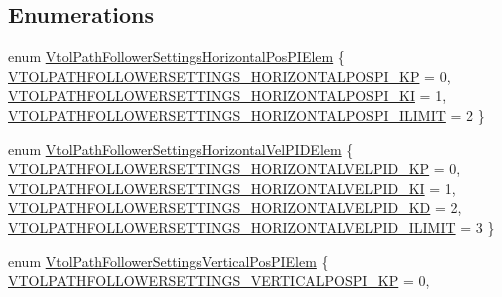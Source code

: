 \subsection*{\-Enumerations}
\begin{DoxyCompactItemize}
\item 
enum \hyperlink{group___vtol_path_follower_settings_ga0f97e6fc6fd7b85c283aca9974a9ee0e}{\-Vtol\-Path\-Follower\-Settings\-Horizontal\-Pos\-P\-I\-Elem} \{ \hyperlink{group___vtol_path_follower_settings_gga0f97e6fc6fd7b85c283aca9974a9ee0ea81b65fc60e82680e2bbb47d49c7cefb8}{\-V\-T\-O\-L\-P\-A\-T\-H\-F\-O\-L\-L\-O\-W\-E\-R\-S\-E\-T\-T\-I\-N\-G\-S\-\_\-\-H\-O\-R\-I\-Z\-O\-N\-T\-A\-L\-P\-O\-S\-P\-I\-\_\-\-K\-P} = 0, 
\hyperlink{group___vtol_path_follower_settings_gga0f97e6fc6fd7b85c283aca9974a9ee0ea598a42eb1fd3c62e285b0cb7c013001f}{\-V\-T\-O\-L\-P\-A\-T\-H\-F\-O\-L\-L\-O\-W\-E\-R\-S\-E\-T\-T\-I\-N\-G\-S\-\_\-\-H\-O\-R\-I\-Z\-O\-N\-T\-A\-L\-P\-O\-S\-P\-I\-\_\-\-K\-I} = 1, 
\hyperlink{group___vtol_path_follower_settings_gga0f97e6fc6fd7b85c283aca9974a9ee0ea1b514b01f7f7cc67559fbcfde8dc5d8d}{\-V\-T\-O\-L\-P\-A\-T\-H\-F\-O\-L\-L\-O\-W\-E\-R\-S\-E\-T\-T\-I\-N\-G\-S\-\_\-\-H\-O\-R\-I\-Z\-O\-N\-T\-A\-L\-P\-O\-S\-P\-I\-\_\-\-I\-L\-I\-M\-I\-T} = 2
 \}
\item 
enum \hyperlink{group___vtol_path_follower_settings_ga6e23e9e9dbc1f73988c39bb155dfd2f7}{\-Vtol\-Path\-Follower\-Settings\-Horizontal\-Vel\-P\-I\-D\-Elem} \{ \hyperlink{group___vtol_path_follower_settings_gga6e23e9e9dbc1f73988c39bb155dfd2f7a296a9a79b82547f81d922ed9fe04f7ec}{\-V\-T\-O\-L\-P\-A\-T\-H\-F\-O\-L\-L\-O\-W\-E\-R\-S\-E\-T\-T\-I\-N\-G\-S\-\_\-\-H\-O\-R\-I\-Z\-O\-N\-T\-A\-L\-V\-E\-L\-P\-I\-D\-\_\-\-K\-P} = 0, 
\hyperlink{group___vtol_path_follower_settings_gga6e23e9e9dbc1f73988c39bb155dfd2f7af536f7bde87052128e9736f3ce52e2d1}{\-V\-T\-O\-L\-P\-A\-T\-H\-F\-O\-L\-L\-O\-W\-E\-R\-S\-E\-T\-T\-I\-N\-G\-S\-\_\-\-H\-O\-R\-I\-Z\-O\-N\-T\-A\-L\-V\-E\-L\-P\-I\-D\-\_\-\-K\-I} = 1, 
\hyperlink{group___vtol_path_follower_settings_gga6e23e9e9dbc1f73988c39bb155dfd2f7a2d699c1acaa523f12d11014596127d4b}{\-V\-T\-O\-L\-P\-A\-T\-H\-F\-O\-L\-L\-O\-W\-E\-R\-S\-E\-T\-T\-I\-N\-G\-S\-\_\-\-H\-O\-R\-I\-Z\-O\-N\-T\-A\-L\-V\-E\-L\-P\-I\-D\-\_\-\-K\-D} = 2, 
\hyperlink{group___vtol_path_follower_settings_gga6e23e9e9dbc1f73988c39bb155dfd2f7ab2ca84213f8a64f867925e105dc9ba0e}{\-V\-T\-O\-L\-P\-A\-T\-H\-F\-O\-L\-L\-O\-W\-E\-R\-S\-E\-T\-T\-I\-N\-G\-S\-\_\-\-H\-O\-R\-I\-Z\-O\-N\-T\-A\-L\-V\-E\-L\-P\-I\-D\-\_\-\-I\-L\-I\-M\-I\-T} = 3
 \}
\item 
enum \hyperlink{group___vtol_path_follower_settings_gac103dd2958acb7d5e6d4dd550386f310}{\-Vtol\-Path\-Follower\-Settings\-Vertical\-Pos\-P\-I\-Elem} \{ \hyperlink{group___vtol_path_follower_settings_ggac103dd2958acb7d5e6d4dd550386f310abdd94f0af941846fc5f1d7e8c52b1a66}{\-V\-T\-O\-L\-P\-A\-T\-H\-F\-O\-L\-L\-O\-W\-E\-R\-S\-E\-T\-T\-I\-N\-G\-S\-\_\-\-V\-E\-R\-T\-I\-C\-A\-L\-P\-O\-S\-P\-I\-\_\-\-K\-P} = 0, 

\end{DoxyCompactItemize}
